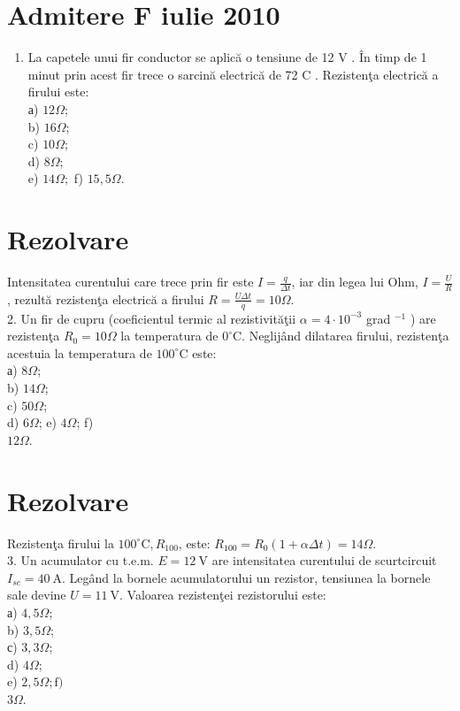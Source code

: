 \section{Admitere F iulie 2010}

\begin{enumerate}
  \item La capetele unui fir conductor se aplică o tensiune de 12 V . În timp de 1 minut prin acest fir trece o sarcină electrică de 72 C . Rezistenţa electrică a firului este:\\
а) $12 \Omega$;\\
b) $16 \Omega$;\\
c) $10 \Omega$;\\
d) $8 \Omega$;\\
e) $14 \Omega ;$ f) $15,5 \Omega$.
\end{enumerate}

\section*{Rezolvare}
Intensitatea curentului care trece prin fir este $I=\frac{q}{\Delta t}$, iar din legea lui Ohm, $I=\frac{U}{R}$, rezultă rezistenţa electrică a firului $R=\frac{U \Delta t}{q}=10 \Omega$.\\
2. Un fir de cupru (coeficientul termic al rezistivităţii $\alpha=4 \cdot 10^{-3}$ grad $^{-1}$ ) are rezistenţa $R_{0}=10 \Omega$ la temperatura de $0^{\circ} \mathrm{C}$. Neglijând dilatarea firului, rezistenţa acestuia la temperatura de $100^{\circ} \mathrm{C}$ este:\\
а) $8 \Omega$;\\
b) $14 \Omega$;\\
c) $50 \Omega$;\\
d) $6 \Omega$; e) $4 \Omega$; f)\\
$12 \Omega$.

\section*{Rezolvare}
Rezistenţa firului la $100^{\circ} \mathrm{C}, R_{100}$, este: $R_{100}=R_{0}(1+\alpha \Delta t)=14 \Omega$.\\
3. Un acumulator cu t.e.m. $E=12 \mathrm{~V}$ are intensitatea curentului de scurtcircuit $I_{s c}=40 \mathrm{~A}$. Legând la bornele acumulatorului un rezistor, tensiunea la bornele sale devine $U=11 \mathrm{~V}$. Valoarea rezistenţei rezistorului este:\\
а) $4,5 \Omega$;\\
b) $3,5 \Omega$;\\
с) $3,3 \Omega$;\\
d) $4 \Omega$;\\
e) $2,5 \Omega ; \mathrm{f})$\\
$3 \Omega$.

